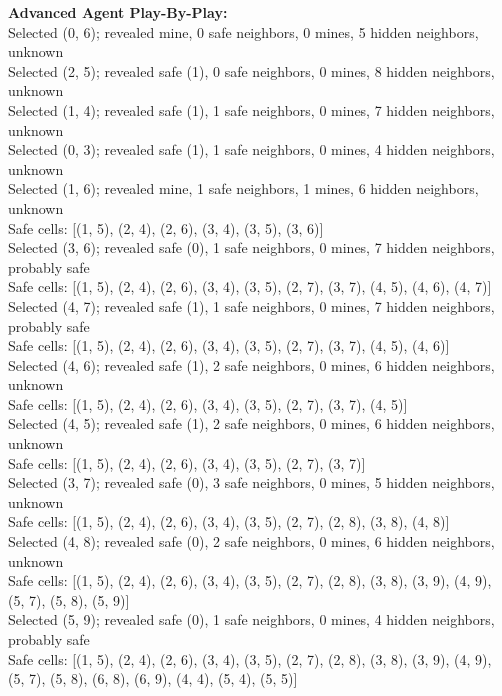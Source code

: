 \documentclass[11pt]{article} %
\begin{document}
\textbf{Advanced Agent Play-By-Play:}\\
Selected (0, 6); revealed mine, 0 safe neighbors, 0 mines, 5 hidden neighbors, unknown\\
Selected (2, 5); revealed safe (1), 0 safe neighbors, 0 mines, 8 hidden neighbors, unknown\\
Selected (1, 4); revealed safe (1), 1 safe neighbors, 0 mines, 7 hidden neighbors, unknown\\
Selected (0, 3); revealed safe (1), 1 safe neighbors, 0 mines, 4 hidden neighbors, unknown\\
Selected (1, 6); revealed mine, 1 safe neighbors, 1 mines, 6 hidden neighbors, unknown\\
Safe cells: [(1, 5), (2, 4), (2, 6), (3, 4), (3, 5), (3, 6)]\\
Selected (3, 6); revealed safe (0), 1 safe neighbors, 0 mines, 7 hidden neighbors, probably safe\\
Safe cells: [(1, 5), (2, 4), (2, 6), (3, 4), (3, 5), (2, 7), (3, 7), (4, 5), (4, 6), (4, 7)]\\
Selected (4, 7); revealed safe (1), 1 safe neighbors, 0 mines, 7 hidden neighbors, probably safe\\
Safe cells: [(1, 5), (2, 4), (2, 6), (3, 4), (3, 5), (2, 7), (3, 7), (4, 5), (4, 6)]\\
Selected (4, 6); revealed safe (1), 2 safe neighbors, 0 mines, 6 hidden neighbors, unknown\\
Safe cells: [(1, 5), (2, 4), (2, 6), (3, 4), (3, 5), (2, 7), (3, 7), (4, 5)]\\
Selected (4, 5); revealed safe (1), 2 safe neighbors, 0 mines, 6 hidden neighbors, unknown\\
Safe cells: [(1, 5), (2, 4), (2, 6), (3, 4), (3, 5), (2, 7), (3, 7)]\\
Selected (3, 7); revealed safe (0), 3 safe neighbors, 0 mines, 5 hidden neighbors, unknown\\
Safe cells: [(1, 5), (2, 4), (2, 6), (3, 4), (3, 5), (2, 7), (2, 8), (3, 8), (4, 8)]\\
Selected (4, 8); revealed safe (0), 2 safe neighbors, 0 mines, 6 hidden neighbors, unknown\\
Safe cells: [(1, 5), (2, 4), (2, 6), (3, 4), (3, 5), (2, 7), (2, 8), (3, 8), (3, 9), (4, 9), (5, 7), (5, 8), (5, 9)]\\
Selected (5, 9); revealed safe (0), 1 safe neighbors, 0 mines, 4 hidden neighbors, probably safe\\
Safe cells: [(1, 5), (2, 4), (2, 6), (3, 4), (3, 5), (2, 7), (2, 8), (3, 8), (3, 9), (4, 9), (5, 7), (5, 8), (6, 8), (6, 9), (4, 4), (5, 4), (5, 5)]\\
\end{document}
